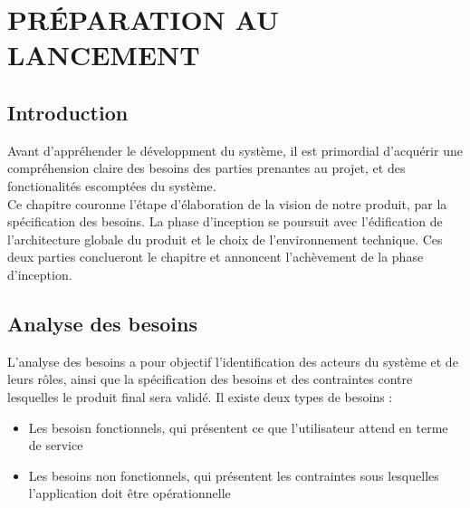 \setcounter{chapter}{2}
\chapter{PRÉPARATION AU LANCEMENT}
\minitoc %
\graphicspath{{Chapitre3/figures/}}


\pagestyle{fancy}
\fancyhf{}
\fancyhead[R]{\bfseries\rightmark}
\fancyfoot[R]{\thepage}
\renewcommand{\headrulewidth}{0.5pt}
\renewcommand{\footrulewidth}{0pt}
\renewcommand{\chaptermark}[1]{\markboth{\MakeUppercase{\chaptername~\thechapter. #1 }}{}}
\renewcommand{\sectionmark}[1]{\markright{\thechapter.\thesection~ #1}}

\begin{spacing}{1.5}

\section*{Introduction}
Avant d'appréhender le développment du système, il est primordial d'acquérir une compréhension claire des besoins des parties prenantes au projet, et des fonctionalités escomptées du système.\\
Ce chapitre couronne l'étape d'élaboration de la vision de notre produit, par la spécification des besoins. La phase d'inception se poursuit avec l'édification de l'architecture globale du produit et le choix de l'environnement technique. Ces deux parties conclueront le chapitre et annoncent l'achèvement de la phase d'inception.

\section{Analyse des besoins}
L'analyse des besoins a pour objectif l'identification des acteurs du système et de leurs rôles, ainsi que la spécification des besoins et des contraintes contre lesquelles le produit final sera validé. Il existe deux types de besoins :
\begin{itemize}
    \item Les besoisn fonctionnels, qui présentent ce que l'utilisateur attend en terme de service
    \item Les besoins non fonctionnels, qui présentent les contraintes sous lesquelles l'application doit être opérationnelle
\end{itemize}


\end{spacing}
